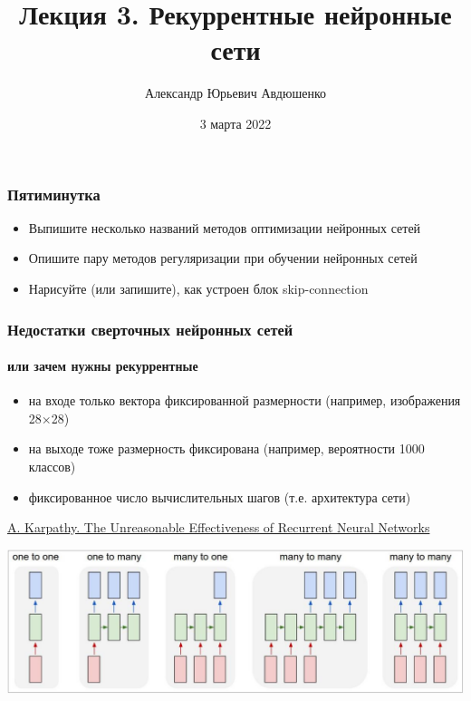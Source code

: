 \documentclass[fullscreen=true, bookmarks=true, hyperref={pdfencoding=unicode}]{beamer}
\title{Лекция 3. Рекуррентные нейронные сети}
\author{Александр Юрьевич Авдюшенко}
\institute{МКН СПбГУ}
\date{3 марта 2022}
\begin{document}

\begin{frame}
\transdissolve[duration=0.2]
\titlepage
\end{frame}


\begin{frame}
  \frametitle{Пятиминутка}
  \begin{itemize}
    \item Выпишите несколько названий методов оптимизации нейронных сетей
    \item Опишите пару методов регуляризации при обучении нейронных сетей
    \item Нарисуйте (или запишите), как устроен блок skip-connection
  \end{itemize}
\end{frame}


\begin{frame}
  \frametitle{Недостатки сверточных нейронных сетей}
  \framesubtitle{или зачем нужны рекуррентные}
  \begin{itemize}
    \item на входе только вектора фиксированной размерности (например, изображения 28$\times$28)
    \item на выходе тоже размерность фиксирована (например, вероятности 1000 классов)
    \item фиксированное число вычислительных шагов (т.е. архитектура сети)
  \end{itemize}
  \pause
  \href{http://karpathy.github.io/2015/05/21/rnn-effectiveness/}{A. Karpathy. The Unreasonable Effectiveness of Recurrent Neural Networks}
  \begin{center}
    \includegraphics[keepaspectratio,
                     width=0.6\paperwidth]{rnn_architectures.jpg}
  \end{center}
\end{frame}
\end{document}
